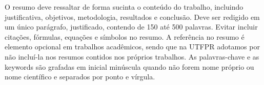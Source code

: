 
\begin{resumoutfpr}%
O resumo deve ressaltar de forma sucinta o conteúdo do trabalho, incluindo justificativa, objetivos, metodologia, resultados e conclusão. Deve ser redigido em um único parágrafo, justificado, contendo de 150 até 500 palavras. Evitar incluir citações, fórmulas, equações e símbolos no resumo. A referência no resumo é elemento opcional em trabalhos acadêmicos, sendo que na UTFPR adotamos por não incluí-la nos resumos contidos nos próprios trabalhos. As palavras-chave e as keywords são grafadas em inicial minúscula quando não forem nome próprio ou nome científico e separados por ponto e vírgula.
\end{resumoutfpr}
